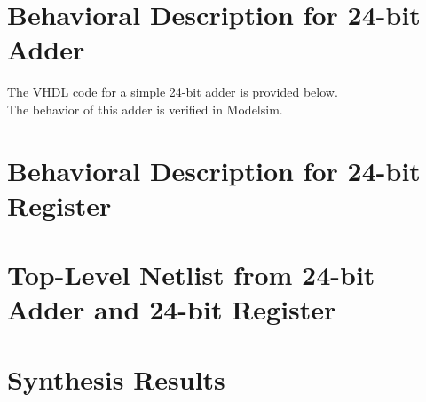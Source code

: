 \documentclass[11pt,a4paper]{article}
\begin{document}
\section{Behavioral Description for 24-bit Adder}

The VHDL code for a simple 24-bit adder is provided below.\\ 




The behavior of this adder is verified in Modelsim. 

\section{Behavioral Description for 24-bit Register}


\section{Top-Level Netlist from 24-bit Adder and 24-bit Register}

 
\section{Synthesis Results}
\end{document}
